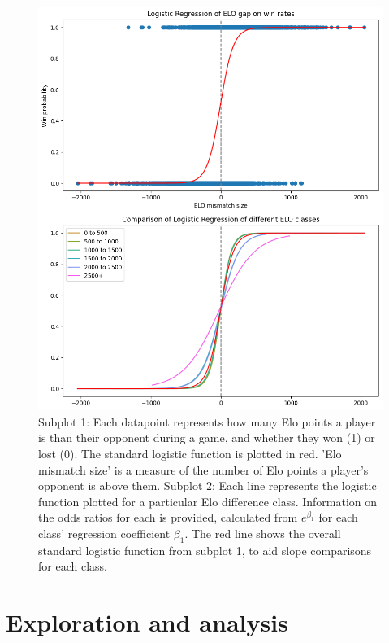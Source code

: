 \documentclass[10pt,a4paper]{article}
\begin{document}
\begin{multicols}{2}
\begin{figure}[p]
  \centering
  \includegraphics[width=\textwidth]{report/images/log_regression_dual.png}
  \caption{Subplot 1: Each datapoint represents how many Elo points a player is than their opponent during a game, and whether they won (1) or lost (0). The standard logistic function is plotted in red. 'Elo mismatch size' is a measure of the number of Elo points a player's opponent is above them. \newline \newline  
  Subplot 2: Each line represents the logistic function plotted for a particular Elo difference class. Information on the odds ratios for each is provided, calculated from $e^{\beta_{1}}$ for each class' regression coefficient $\beta_{1}$. The red line shows the overall standard logistic function from subplot 1, to aid slope comparisons for each class.}
  \label{fds-project-template:fig:log_regression}
\end{figure}



\section{Exploration and  analysis}


\end{multicols}
\end{document}
